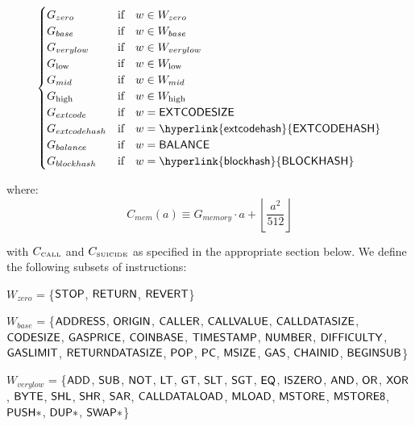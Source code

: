 \begin{equation}
\begin{cases}
G_{zero} & \text{if} \quad w \in W_{zero}\\
G_{base} & \text{if} \quad w \in W_{base}\\
G_{verylow} & \text{if} \quad w \in W_{verylow}\\
G_{\mathrm{low}} & \text{if} \quad w \in W_{\mathrm{low}}\\
G_{mid} & \text{if} \quad w \in W_{mid}\\
G_{\mathrm{high}} & \text{if} \quad w \in W_{\mathrm{high}}\\
G_{extcode} & \text{if} \quad w = \op{EXTCODESIZE}\\
G_{extcodehash} & \text{if} \quad w = \op{\hyperlink{extcodehash}{EXTCODEHASH}}\\
G_{balance} & \text{if} \quad w = \op{BALANCE}\\
G_{blockhash} & \text{if} \quad w = \op{\hyperlink{blockhash}{BLOCKHASH}}\\
\end{cases}
\end{equation}


where:
\begin{equation}
C_{mem}(a) \equiv G_{memory} \cdot a + \left\lfloor \dfrac{a^2}{512} \right\rfloor
\end{equation}

with $C_\text{\tiny CALL}$ and $C_\text{\tiny SUICIDE}$ as specified in the appropriate section below. We define the following subsets of instructions:

$W_{zero}$ = \{$\mathsf{STOP}$, $\mathsf{RETURN}$, $\mathsf{REVERT}$\}

$W_{base}$ = \{$\mathsf{ADDRESS}$, $\mathsf{ORIGIN}$, $\mathsf{CALLER}$, $\mathsf{CALLVALUE}$, $\mathsf{CALLDATASIZE}$, $\mathsf{CODESIZE}$, $\mathsf{GASPRICE}$, $\mathsf{COINBASE}$,
\newline \noindent\hspace*{1.75cm} $\mathsf{TIMESTAMP}$, $\mathsf{NUMBER}$, $\mathsf{DIFFICULTY}$, $\mathsf{GASLIMIT}$, $\mathsf{RETURNDATASIZE}$, $\mathsf{POP}$, $\mathsf{PC}$, $\mathsf{MSIZE}$, $\mathsf{GAS}$, 
\newline \noindent\hspace*{1.75cm} $\mathsf{CHAINID}$, $\mathsf{BEGINSUB}$\}

$W_{verylow}$ = \{$\mathsf{ADD}$, $\mathsf{SUB}$, $\mathsf{NOT}$, $\mathsf{LT}$, $\mathsf{GT}$, $\mathsf{SLT}$, $\mathsf{SGT}$, $\mathsf{EQ}$, $\mathsf{ISZERO}$, $\mathsf{AND}$, $\mathsf{OR}$, $\mathsf{XOR}$, $\mathsf{BYTE}$, $\mathsf{SHL}$, $\mathsf{SHR}$, $\mathsf{SAR}$, 
\newline \noindent\hspace*{1.75cm} $\mathsf{CALLDATALOAD}$, $\mathsf{MLOAD}$, $\mathsf{MSTORE}$, $\mathsf{MSTORE8}$, $\mathsf{PUSH*}$, $\mathsf{DUP*}$, $\mathsf{SWAP*}$\}

